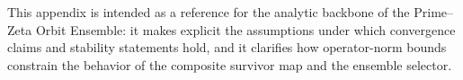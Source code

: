 \documentclass[11pt]{article}
\theoremstyle{definition}
\theoremstyle{plain}
\theoremstyle{remark}
\begin{document}
\bigskip

This appendix is intended as a reference for the analytic backbone of the Prime--Zeta Orbit Ensemble: it makes explicit the assumptions under which convergence claims and stability statements hold, and it clarifies how operator-norm bounds constrain the behavior of the composite survivor map and the ensemble selector.


\nocite{*}

 
\end{document}
